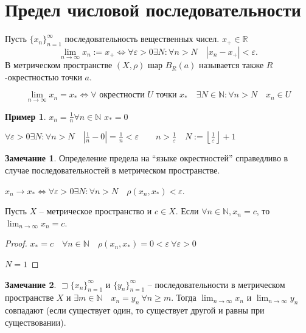 \documentclass{book}
\newcommand\N{\ensuremath{\mathbb{N}}}
\newcommand\R{\ensuremath{\mathbb{R}}}
\theoremstyle{definition}
\newtheorem*{note}{Замечание}
\newtheorem*{example}{Пример}
\begin{document}
    \section{Предел числовой последовательности}
    \begin{definition}
        Пусть $\{x_n\}_{n=1}^{\infty}$ последовательность вещественных чисел. $x_{+}\in \R$
        \[
            \lim_{n \to \infty} x_n := x_+ \iff  \forall \varepsilon>0\exists N: \forall n>N \quad \left| x_n-x_+ \right| <\varepsilon.
        \]
        В метрическом пространстве $(X,\rho)$ шар $B_R(a)$ называется также $R$-окрестностью точки $a$.
    \end{definition}

    \begin{definition}
        $$\lim_{n \to \infty} x_n = x_* \iff \forall \text{ окрестности $U$ точки } x_*\quad \exists N\in \N : \forall n>N\quad x_{n} \in U$$
    \end{definition}
    \begin{example}
            $x_n = \frac{1}{n} \forall n\in \N $
            $x_* = 0$

            $\forall \varepsilon > 0 \exists N: \forall n>N\quad \left| \frac{1}{n} - 0 \right|  = \frac{1}{n}<\varepsilon\qquad n>\frac{1}{\varepsilon}\quad N:= \left\lfloor \frac{1}{\varepsilon} \right\rfloor +1$
    \end{example}
    \begin{note}
        Определение предела на ``языке окрестностей'' справедливо в случае последовательностей в метрическом пространстве.

        $x_n \to x_* \iff  \forall \varepsilon >0 \exists N: \forall n>N\quad \rho(x_n, x_*)<\varepsilon$.
    \end{note}
    \begin{statement}
        Пусть $X$ -- метрическое пространство и $c\in X$. 
        Если $\forall n\in \N , x_n = c$, то  $\lim_{n \to \infty } x_n = c$.
    \end{statement}
    \begin{proof}
        $x_* = c\quad \forall n\in \N \quad \rho(x_n, x_*) = 0<\varepsilon\  \forall \varepsilon > 0$

        $N=1$
    \end{proof}
    \begin{note}
        $\sqsupset \{x_n\}_{n=1}^{\infty }$ и $\{y_n\}_{n=1}^{\infty }$ -- последовательности в метрическом пространстве $X$ и $\exists m\in \N \quad x_n = y_n\ \forall n\geqslant m$. 
        Тогда $\lim_{n \to \infty} x_n$ и $\lim_{n \to \infty} y_n$ совпадают (если существует один, то существует другой и равны при существовании).
    \end{note}
\end{document}
